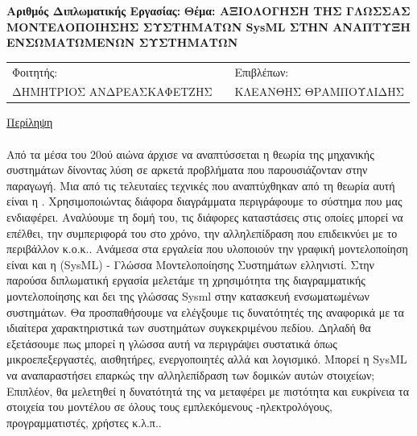 \documentclass[a4paper,12pt,twoside]{report}
\newcommand{ \FirstName}{ΔΗΜΗΤΡΙΟΣ ΑΝΔΡΕΑΣ}
\newcommand{ \LastName}{ΚΑΦΕΤΖΗΣ}
\newcommand{ \ThesisTitle}{ΑΞΙΟΛΟΓΗΣΗ ΤΗΣ ΓΛΩΣΣΑΣ ΜΟΝΤΕΛΟΠΟΙΗΣΗΣ ΣΥΣΤΗΜΑΤΩΝ SysML ΣΤΗΝ ΑΝΑΠΤΥΞΗ ΕΝΣΩΜΑΤΩΜΕΝΩΝ ΣΥΣΤΗΜΑΤΩΝ}
\newcommand{ \FirstProfessor}{ΚΛΕΑΝΘΗΣ ΘΡΑΜΠΟΥΛΙΔΗΣ}
\begin{document}
	\cleardoublepage
	\label{Τρίτη σελίδα}
		\begin{large}
			\begin{flushleft}
				\textbf{Αριθμός Διπλωματικής Εργασίας:}\linebreak \linebreak
				\textbf{Θέμα: \ThesisTitle} \linebreak \linebreak
			\end{flushleft}
			\begin{tabular}{p{6cm} p{1cm} p{6cm}}
				Φοιτητής: & & Επιβλέπων:\\
				\FirstName\space\LastName & & \FirstProfessor\\
			\end{tabular}
			\linebreak \linebreak
			\begin{flushleft}\underline{{\large Περίληψη}}	\end{flushleft}
				\paragraph{}{Από τα μέσα του 20ού αιώνα άρχισε να αναπτύσσεται η θεωρία της μηχανικής συστημάτων δίνοντας λύση σε αρκετά προβλήματα που παρουσιάζονταν στην παραγωγή. Μια από τις τελευταίες τεχνικές που αναπτύχθηκαν από τη θεωρία αυτή είναι η . Χρησιμοποιώντας διάφορα διαγράμματα περιγράφουμε το σύστημα που μας ενδιαφέρει. Αναλύουμε τη δομή του, τις διάφορες καταστάσεις στις οποίες μπορεί να επέλθει, την συμπεριφορά του στο χρόνο, την αλληλεπίδραση που επιδεικνύει με το περιβάλλον κ.ο.κ.. Ανάμεσα στα εργαλεία που υλοποιούν την γραφική μοντελοποίηση είναι και η  (SysML) - Γλώσσα Μοντελοποίησης Συστημάτων ελληνιστί.\linebreak
				Στην παρούσα διπλωματική εργασία μελετάμε τη χρησιμότητα της διαγραμματικής μοντελοποίησης και δει της γλώσσας Sysml στην κατασκευή ενσωματωμένων συστημάτων. Θα προσπαθήσουμε να ελέγξουμε τις δυνατότητές της αναφορικά με τα ιδιαίτερα χαρακτηριστικά των συστημάτων συγκεκριμένου πεδίου. Δηλαδή θα εξετάσουμε πως μπορεί η γλώσσα αυτή να περιγράψει συστατικά όπως μικροεπεξεργαστές, αισθητήρες, ενεργοποιητές  αλλά και λογισμικό. Μπορεί η SysML να αναπαραστήσει επαρκώς την αλληλεπίδραση των δομικών αυτών στοιχείων; Επιπλέον, θα μελετηθεί η δυνατότητά της να μεταφέρει με πιστότητα και ευκρίνεια τα στοιχεία του μοντέλου σε όλους τους εμπλεκόμενους -ηλεκτρολόγους, προγραμματιστές, χρήστες κ.λ.π..
			}
		\end{large}
\end{document}
